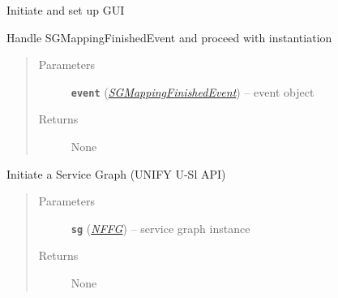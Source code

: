 \documentclass[letterpaper,10pt,english]{sphinxmanual}
\begin{document}
\begin{fulllineitems}
\begin{fulllineitems}
\end{fulllineitems}


\begin{fulllineitems}
\label{service/sas_API:escape.service.sas_API.ServiceLayerAPI._initiate_gui}
Initiate and set up GUI

\end{fulllineitems}


\begin{fulllineitems}
\label{service/sas_API:escape.service.sas_API.ServiceLayerAPI._handle_SGMappingFinishedEvent}
Handle SGMappingFinishedEvent and proceed with  {\hyperref[util/nffg:escape.util.nffg.NFFG]{\emph{}}} instantiation
\begin{quote}\begin{description}
\item[{Parameters}] \leavevmode
\textbf{\texttt{event}} ({\hyperref[service/sas_mapping:escape.service.sas_mapping.SGMappingFinishedEvent]{\emph{\emph{SGMappingFinishedEvent}}}}) -- event object

\item[{Returns}] \leavevmode
None

\end{description}\end{quote}

\end{fulllineitems}


\begin{fulllineitems}
\label{service/sas_API:escape.service.sas_API.ServiceLayerAPI.request_service}
Initiate a Service Graph (UNIFY U-Sl API)
\begin{quote}\begin{description}
\item[{Parameters}] \leavevmode
\textbf{\texttt{sg}} ({\hyperref[util/nffg:escape.util.nffg.NFFG]{\emph{\emph{NFFG}}}}) -- service graph instance

\item[{Returns}] \leavevmode
None


\end{description}
\end{quote}
\end{fulllineitems}
\end{fulllineitems}
\end{document}
